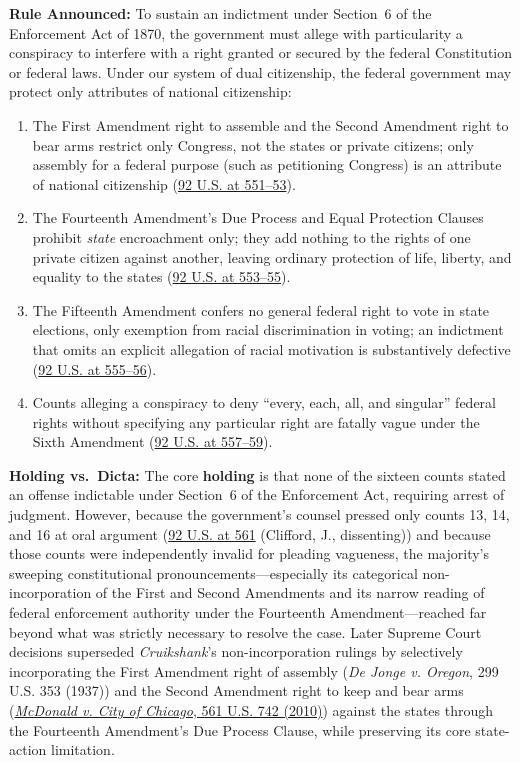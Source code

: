 \documentclass[12pt]{article}
\begin{document}
\textbf{Rule Announced:} To sustain an indictment under Section~6 of the Enforcement Act of 1870, the government must allege with particularity a conspiracy to interfere with a right granted or secured by the federal Constitution or federal laws. Under our system of dual citizenship, the federal government may protect only attributes of national citizenship:
\begin{enumerate}
    \item The First Amendment right to assemble and the Second Amendment right to bear arms restrict only Congress, not the states or private citizens; only assembly for a federal purpose (such as petitioning Congress) is an attribute of national citizenship (\href{https://supreme.justia.com/cases/federal/us/92/542/}{92 U.S. at 551--53}).
    \item The Fourteenth Amendment's Due Process and Equal Protection Clauses prohibit \textit{state} encroachment only; they add nothing to the rights of one private citizen against another, leaving ordinary protection of life, liberty, and equality to the states (\href{https://supreme.justia.com/cases/federal/us/92/542/}{92 U.S. at 553--55}).
    \item The Fifteenth Amendment confers no general federal right to vote in state elections, only exemption from racial discrimination in voting; an indictment that omits an explicit allegation of racial motivation is substantively defective (\href{https://supreme.justia.com/cases/federal/us/92/542/}{92 U.S. at 555--56}).
    \item Counts alleging a conspiracy to deny ``every, each, all, and singular'' federal rights without specifying any particular right are fatally vague under the Sixth Amendment (\href{https://supreme.justia.com/cases/federal/us/92/542/}{92 U.S. at 557--59}).
\end{enumerate}

\textbf{Holding vs.~Dicta:} The core \textbf{holding} is that none of the sixteen counts stated an offense indictable under Section~6 of the Enforcement Act, requiring arrest of judgment. However, because the government's counsel pressed only counts 13, 14, and 16 at oral argument (\href{https://supreme.justia.com/cases/federal/us/92/542/}{92 U.S. at 561} (Clifford, J., dissenting)) and because those counts were independently invalid for pleading vagueness, the majority's sweeping constitutional pronouncements---especially its categorical non-incorporation of the First and Second Amendments and its narrow reading of federal enforcement authority under the Fourteenth Amendment---reached far beyond what was strictly necessary to resolve the case. Later Supreme Court decisions superseded \textit{Cruikshank}'s non-incorporation rulings by selectively incorporating the First Amendment right of assembly (\textit{De Jonge v. Oregon}, 299 U.S. 353 (1937)) and the Second Amendment right to keep and bear arms (\href{https://www.law.cornell.edu/supct/html/08-1521.ZO.html}{\textit{McDonald v. City of Chicago}, 561 U.S. 742 (2010)}) against the states through the Fourteenth Amendment's Due Process Clause, while preserving its core state-action limitation.
\end{document}
